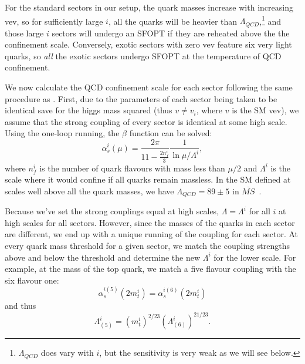 \documentclass[nofootinbib,twocolumn,preprintnumbers]{revtex4-1}
\begin{document}
For the standard sectors in our setup, the quark masses increase with increasing vev, so for sufficiently large $i$, all the quarks will be heavier than $\Lambda_{QCD}$,\footnote{$\Lambda_{QCD}$ does vary with $i$, but the sensitivity is very weak as we will see below.} and those large $i$ sectors will undergo an SFOPT if they are reheated above the the confinement scale. 
Conversely, exotic sectors with zero vev feature six very light quarks, so \textit{all} the exotic sectors undergo SFOPT at the temperature of QCD confinement. 

We now calculate the QCD confinement scale for each sector following the same procedure as \cite{Cui:2011wk}. First, due to the parameters of each sector being taken to be identical save for the higgs mass squared (thus $v \neq v_i$, where $v$ is the SM vev), we assume that the strong coupling of every sector is identical at some high scale. Using the one-loop running, the $\beta$ function can be solved:
\begin{equation}\label{eqn:QCDrunningi}
\alpha_{s}^i (\mu) = \frac{2\pi}{11-\frac{2n^i_f}{3}}\frac{1}{\ln{\mu/\Lambda^i}},
\end{equation}
where $n_f^i$ is the number of quark flavours with mass less than $\mu/2$ and $\Lambda^i$ is the scale where it would confine if all quarks remain massless. In the SM defined at scales well above all the quark masses, we have $\Lambda_{QCD} = 89 \pm 5$ in $\overline{MS}$~\cite{PhysRevD.98.030001}. 

Because we've set the strong couplings equal at high scales, $\Lambda = \Lambda^i$ for all $i$ at high scales for all sectors. However, since the masses of the quarks in each sector are different, we end up with a unique running of the coupling for each sector. At every quark mass threshold for a given sector, we match the coupling strengths above and below the threshold and determine the new $\Lambda^i$ for the lower scale. For example, at the mass of the top quark, we match a five flavour coupling with the six flavour one:
\begin{equation}
\alpha_s^{i(5)}(2 m^i_t) = \alpha_s^{i(6)}(2 m^i_t) 
\end{equation} 
and thus
\begin{equation}
\Lambda_{(5)}^i = (m_t^{i})^{2/23}(\Lambda_{(6)}^i)^{21/23}.
\end{equation}
\end{document}

